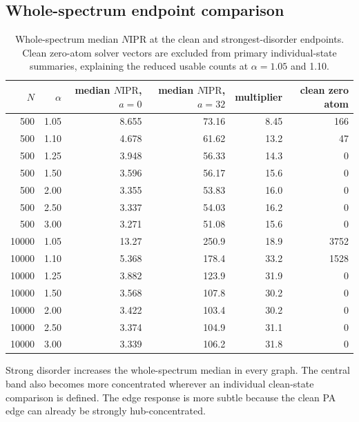 \documentclass[11pt]{article}
\begin{document}
\subsection{Whole-spectrum endpoint comparison}

\begin{table}[H]
\centering
\scriptsize
\begin{tabular}{@{}rrrrrr@{}}
\toprule
\(N\) & \(\alpha\) & median \(N\mathrm{IPR}\), \(a=0\) & median \(N\mathrm{IPR}\), \(a=32\) & multiplier & clean zero atom \\
\midrule
500 & 1.05 & 8.655 & 73.16 & 8.45 & 166 \\
500 & 1.10 & 4.678 & 61.62 & 13.2 & 47 \\
500 & 1.25 & 3.948 & 56.33 & 14.3 & 0 \\
500 & 1.50 & 3.596 & 56.17 & 15.6 & 0 \\
500 & 2.00 & 3.355 & 53.83 & 16.0 & 0 \\
500 & 2.50 & 3.337 & 54.03 & 16.2 & 0 \\
500 & 3.00 & 3.271 & 51.08 & 15.6 & 0 \\
\midrule
10000 & 1.05 & 13.27 & 250.9 & 18.9 & 3752 \\
10000 & 1.10 & 5.368 & 178.4 & 33.2 & 1528 \\
10000 & 1.25 & 3.882 & 123.9 & 31.9 & 0 \\
10000 & 1.50 & 3.568 & 107.8 & 30.2 & 0 \\
10000 & 2.00 & 3.422 & 103.4 & 30.2 & 0 \\
10000 & 2.50 & 3.374 & 104.9 & 31.1 & 0 \\
10000 & 3.00 & 3.339 & 106.2 & 31.8 & 0 \\
\bottomrule
\end{tabular}
\caption{Whole-spectrum median \(N\mathrm{IPR}\) at the clean and strongest-disorder endpoints.  Clean zero-atom solver vectors are excluded from primary individual-state summaries, explaining the reduced usable counts at \(\alpha=1.05\) and 1.10.}
\label{tab:disorder-whole}
\end{table}

Strong disorder increases the whole-spectrum median in every graph.  The central band also becomes more concentrated wherever an individual clean-state comparison is defined.  The edge response is more subtle because the clean PA edge can already be strongly hub-concentrated.
\end{document}

